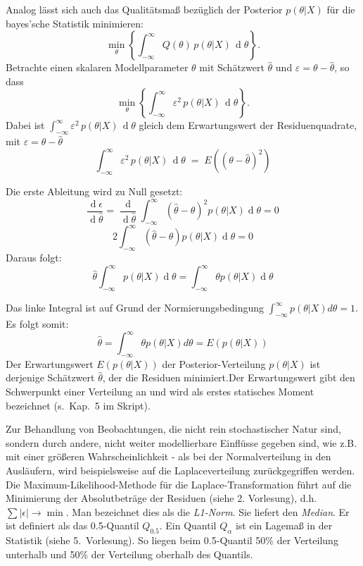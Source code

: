 Analog lässt sich auch das Qualitätsmaß bezüglich der Posterior $p(\theta|X)$ für die bayes'sche Statistik minimieren:
\begin{equation}
\min_{\theta} \left\{ \int_{-\infty}^{\infty} Q(\theta)  \, p(\theta|X) \, \operatorname d \theta \right\} .
\end{equation}
Betrachte einen skalaren Modellparameter $\theta$ mit Schätzwert $\hat \theta$ und $\varepsilon = \theta - \hat \theta$, so dass
\begin{equation}
\min_{\theta} \left\{ \int_{-\infty}^{\infty} \varepsilon^2  \, p(\theta|X) \, \operatorname d \theta \right\} .
\end{equation}
Dabei ist $\int_{-\infty}^{\infty} \varepsilon^2  \, p(\theta|X) \, \operatorname d \theta$ gleich dem Erwartungswert der
Residuenquadrate, mit $\varepsilon = \theta - \hat \theta$
$$
\int_{-\infty}^{\infty} \varepsilon^2  \, p(\theta|X) \, \operatorname d \theta \;
= \; E( (\theta - \hat \theta)^2 )
$$

Die erste Ableitung wird zu Null gesetzt:
\begin{equation}
\frac{\operatorname d \epsilon}{\operatorname d \hat\theta } = \frac{\operatorname d}{\operatorname d \hat\theta } \int_{-\infty}^{\infty}
(\hat\theta - \theta)^2 p(\theta|X) \operatorname d\theta = 0
\end{equation}
\[
2 \int_{-\infty}^{\infty} (\hat\theta - \theta) p(\theta|X) \operatorname d\theta = 0
\]
Daraus folgt:
\[
\hat\theta \int_{-\infty}^{\infty} p(\theta|X) \operatorname d\theta = \int_{-\infty}^{\infty} \theta p(\theta|X) \operatorname d \theta
\]

Das linke Integral ist auf Grund der Normierungsbedingung $\int_{-\infty}^{\infty} p(\theta|X) d\theta = 1$. Es folgt somit:
\begin{equation}
\hat\theta = \int_{-\infty}^{\infty} \theta p(\theta|X) d \theta = E(p(\theta|X))
\end{equation}
Der Erwartungswert $E(p(\theta|X))$ der Posterior-Verteilung $p(\theta|X)$ ist derjenige Schätzwert
$\hat{\theta}$, der die Residuen minimiert.Der Erwartungswert gibt den Schwerpunkt einer Verteilung an und wird als
erstes statisches Moment bezeichnet (s.\ Kap.\ 5 im Skript). 

Zur Behandlung von Beobachtungen, die nicht rein stochastischer Natur sind, sondern durch andere, nicht weiter
modellierbare Einflüsse gegeben sind, wie z.B. mit einer größeren Wahrscheinlichkeit - als bei der Normalverteilung in den
Ausläufern, wird beispielsweise auf die Laplaceverteilung zurückgegriffen werden. Die Maximum-Likelihood-Methode für die Laplace-Transformation führt auf die Minimierung der Absolutbeträge der Residuen (siehe 2. Vorlesung),
d.h. $\sum \left|\epsilon \right| \rightarrow \min$. Man bezeichnet dies
als die \textit{L1-Norm}. Sie liefert den \textit{Median}. Er ist
definiert als das 0.5-Quantil $Q_{0.5}$. Ein Quantil $Q_\alpha$ ist ein Lagemaß in der Statistik (siehe 5.~Vorlesung). So liegen beim 0.5-Quantil 50\% der Verteilung unterhalb und 50\% der Verteilung oberhalb des Quantils.

